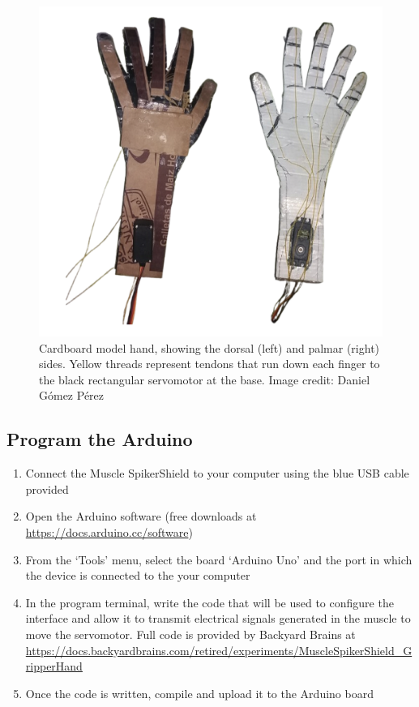 \documentclass{article}
\begin{document}
\begin{figure}[!htbp]
\centering
\includegraphics[width=0.7\linewidth]{files/EPpXta8zJdzN048lz8AR-4f049cefc47709553d6ee28b9743dba5.png}
\caption[]{Cardboard model hand, showing the dorsal (left) and palmar (right) sides. Yellow threads represent tendons that run down each finger to the black rectangular servomotor at the base. Image credit: Daniel Gómez Pérez}
\label{mlSs5a3cGd}
\end{figure}

\subsection{Program the Arduino}

\begin{enumerate}
\item Connect the Muscle SpikerShield to your computer using the blue USB cable provided
\item Open the Arduino software (free downloads at \href{https://docs.arduino.cc/software}{https://docs.arduino.cc/software})
\item From the `Tools' menu, select the board `Arduino Uno' and the port in which the device is connected to the your computer
\item In the program terminal, write the code that will be used to configure the interface and allow it to transmit electrical signals generated in the muscle to move the servomotor. Full code is provided by Backyard Brains at \href{https://docs.backyardbrains.com/retired/experiments/MuscleSpikerShield\_GripperHand}{https://docs.backyardbrains.com/retired/experiments/MuscleSpikerShield\_GripperHand}
\item Once the code is written, compile and upload it to the Arduino board
\end{enumerate}
\end{document}
